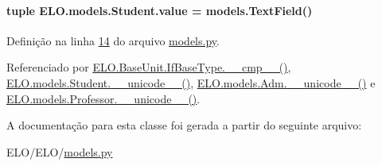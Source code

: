 \hypertarget{classELO_1_1models_1_1Student_a201226779dce6e064cb16bd92ed016e2}{
\paragraph[{value}]{\setlength{\rightskip}{0pt plus 5cm}tuple E\-L\-O.\-models.\-Student.\-value = models.\-Text\-Field()\hspace{0.3cm}{\ttfamily [static]}}}\label{classELO_1_1models_1_1Student_a201226779dce6e064cb16bd92ed016e2}


Definição na linha \hyperlink{ELO_2models_8py_source_l00014}{14} do arquivo \hyperlink{ELO_2models_8py_source}{models.\-py}.



Referenciado por \hyperlink{classELO_1_1BaseUnit_1_1IfBaseType_a69c338f6f1574bd3524e9d59ebc17a7c}{E\-L\-O.\-Base\-Unit.\-If\-Base\-Type.\-\_\-\-\_\-cmp\-\_\-\-\_\-()}, \hyperlink{classELO_1_1models_1_1Student_a2f51785c1beb3b45269a8678d97ec783}{E\-L\-O.\-models.\-Student.\-\_\-\-\_\-unicode\-\_\-\-\_\-()}, \hyperlink{classELO_1_1models_1_1Adm_a3541c3ae12b8d2da3f44ac6be00a23e6}{E\-L\-O.\-models.\-Adm.\-\_\-\-\_\-unicode\-\_\-\-\_\-()} e \hyperlink{classELO_1_1models_1_1Professor_aefc9d63d429e19ec3487a7879879f29d}{E\-L\-O.\-models.\-Professor.\-\_\-\-\_\-unicode\-\_\-\-\_\-()}.



A documentação para esta classe foi gerada a partir do seguinte arquivo\-:\begin{DoxyCompactItemize}
\item 
E\-L\-O/\-E\-L\-O/\hyperlink{ELO_2models_8py}{models.\-py}\end{DoxyCompactItemize}
